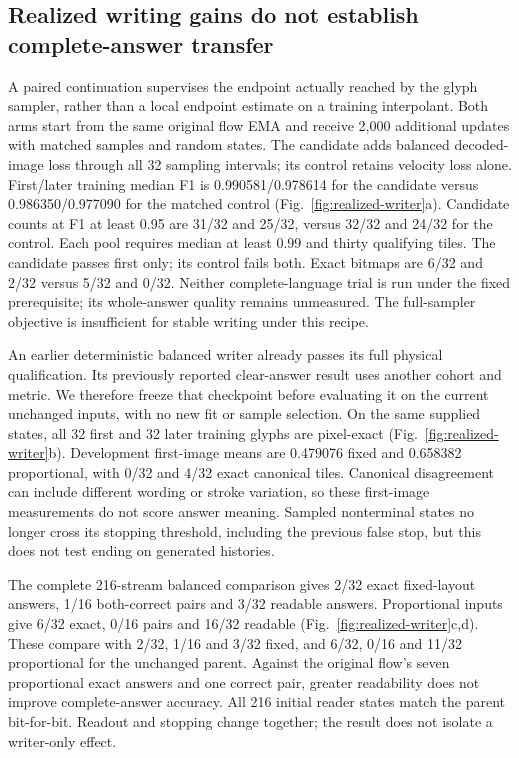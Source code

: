 \subsection*{Realized writing gains do not establish complete-answer transfer}
A paired continuation supervises the endpoint actually reached by the glyph
sampler, rather than a local endpoint estimate on a training interpolant.
Both arms start from the same original flow EMA and receive 2,000 additional
updates with matched samples and random states. The candidate adds balanced
decoded-image loss through all 32 sampling intervals; its control retains
velocity loss alone. First/later training median F1 is 0.990581/0.978614 for
the candidate versus 0.986350/0.977090 for the matched control
(Fig.~\ref{fig:realized-writer}a). Candidate counts at F1 at least 0.95 are
31/32 and 25/32, versus 32/32 and 24/32 for the control. Each pool requires
median at least 0.99 and thirty qualifying tiles. The candidate passes first
only; its control fails both. Exact bitmaps are 6/32 and 2/32 versus 5/32 and
0/32. Neither complete-language trial is run under the fixed prerequisite;
its whole-answer quality remains unmeasured. The full-sampler objective is
insufficient for stable writing under this recipe.

An earlier deterministic balanced writer already passes its full physical
qualification. Its previously reported clear-answer result uses another
cohort and metric. We therefore freeze that checkpoint before evaluating it
on the current unchanged inputs, with no new fit or sample selection. On the
same supplied states, all 32 first and 32 later training glyphs are pixel-exact
(Fig.~\ref{fig:realized-writer}b). Development first-image means are 0.479076
fixed and 0.658382 proportional, with 0/32 and 4/32 exact canonical tiles.
Canonical disagreement can include different wording or stroke variation,
so these first-image measurements do not score answer meaning. Sampled
nonterminal states no longer cross its stopping threshold, including the
previous false stop, but this does not test ending on generated histories.

The complete 216-stream balanced comparison gives 2/32 exact fixed-layout
answers, 1/16 both-correct pairs and 3/32 readable answers. Proportional
inputs give 6/32 exact, 0/16 pairs and 16/32 readable
(Fig.~\ref{fig:realized-writer}c,d). These compare with 2/32, 1/16 and 3/32
fixed, and 6/32, 0/16 and 11/32 proportional for the unchanged parent.
Against the original flow's seven proportional exact answers and one correct
pair, greater readability does not improve complete-answer accuracy. All
216 initial reader states match the parent bit-for-bit. Readout and stopping
change together; the result does not isolate a writer-only effect.

